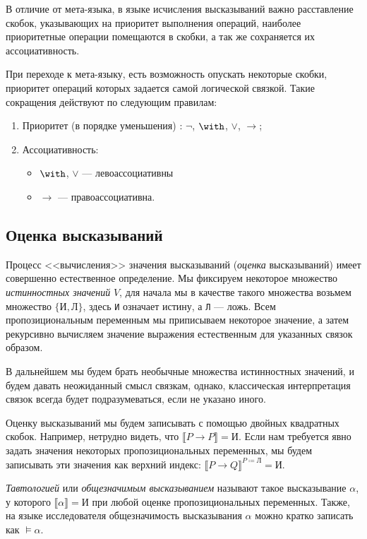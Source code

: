 В отличие от мета-языка, в языке исчисления высказываний важно расставление
скобок, указывающих на приоритет выполнения операций, наиболее приоритетные
операции помещаются в скобки, а так же сохраняется их ассоциативность.

При переходе к мета-языку, есть возможность опускать некоторые скобки, приоритет
операций которых задается самой логической связкой. Такие сокращения действуют по следующим
правилам:
\begin{enumerate}
  \item Приоритет (в порядке уменьшения) : $\neg$, $\with$, $\vee$, $\rightarrow$;
  \item Ассоциативность:
    \begin{itemize}
      \item $\with$, $\vee$ --- левоассоциативны
      \item $\rightarrow$ --- правоассоциативна.
    \end{itemize}
  \end{enumerate}
  
  


\subsection{Оценка высказываний}

Процесс <<вычисления>> значения высказываний (\emph{оценка} высказываний) имеет совершенно
естественное определение. Мы фиксируем некоторое множество
\emph{истинностных значений} $V$, для начала мы в качестве такого множества возьмем 
множество $\{\texttt{И}, \texttt{Л}\}$, здесь \texttt{И} означает истину, а
\texttt{Л} --- ложь. Всем пропозициональным переменным мы приписываем некоторое
значение, а затем рекурсивно вычисляем значение выражения естественным для указанных
связок образом.

В дальнейшем мы будем брать необычные множества истинностных значений, и будем давать
неожиданный смысл связкам, однако, классическая интерпретация связок всегда будет
подразумеваться, если не указано иного.

Оценку высказываний мы будем записывать с помощью двойных квадратных скобок. Например,
нетрудно видеть, что $\llbracket P \rightarrow P \rrbracket = \texttt{И}$.
Если нам требуется явно задать значения некоторых пропозициональных переменных, мы будем
записывать эти значения как верхний индекс: $\llbracket P \rightarrow Q
\rrbracket ^ {P\coloneqq \texttt{Л}} = \texttt{И}$.

\begin{definition} \emph{Тавтологией} или \emph{общезначимым высказыванием}
  называют такое высказывание $\alpha$, у которого $\llbracket \alpha \rrbracket
  = \texttt{И}$ при любой оценке пропозициональных переменных. Также, на языке исследователя общезначимость высказывания $\alpha$ можно кратко записать как $\models \alpha$. 
\end{definition}

